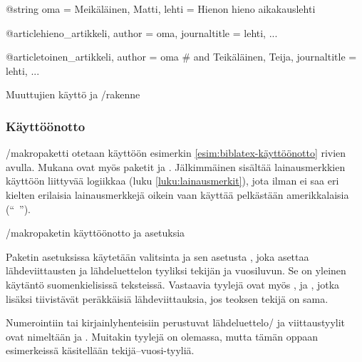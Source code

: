 \begin{esimerkki*}
\begin{koodilohko}
  @string{
    oma = {Meikäläinen, Matti},
    lehti = {Hienon hieno aikakauslehti}
  }

  @article{hieno_artikkeli,
    author = oma,
    journaltitle = lehti,
    ...
  }

  @article{toinen_artikkeli,
    author = oma # { and Teikäläinen, Teija},
    journaltitle = lehti,
    ...
  }
\end{koodilohko}
\caption{Muuttujien käyttö ja \-/rakenne}
\label{esim:bib-muuttujat}
\end{esimerkki*}

\subsubsection{Käyttöönotto}

\-/makropaketti otetaan käyttöön esimerkin
\ref{esim:biblatex-käyttöönotto} rivien avulla. Mukana ovat myös paketit
 ja . Jälkimmäinen sisältää
lainausmerkkien käyttöön liittyvää logiikkaa (luku
\ref{luku:lainausmerkit}), jota ilman  ei saa eri
kielten erilaisia lainausmerkkejä oikein vaan käyttää pelkästään
amerikkalaisia (``~'').

\begin{esimerkki*}
\begin{koodilohko}
  \usepackage{polyglossia}

  \usepackage{csquotes}

  \usepackage[style=authoryear]{biblatex}
\end{koodilohko}
\caption{\-/makropaketin käyttöönotto ja asetuksia}
\label{esim:biblatex-käyttöönotto}
\end{esimerkki*}

Paketin asetuksissa käytetään valitsinta  ja sen asetusta
, joka asettaa lähdeviittausten ja lähdeluettelon
tyyliksi tekijän ja vuosiluvun. Se on yleinen käytäntö suomenkielisissä
teksteissä. Vastaavia tyylejä ovat myös ,
 ja , jotka lisäksi
tiivistävät peräkkäisiä lähdeviittauksia, jos teoksen tekijä on sama.

Numerointiin tai kirjainlyhenteisiin perustuvat lähdeluettelo\-/{} ja
viittaustyylit ovat nimeltään  ja
. Muitakin tyylejä on olemassa, mutta tämän
oppaan esimerkeissä käsitellään tekijä--vuosi-tyyliä.

